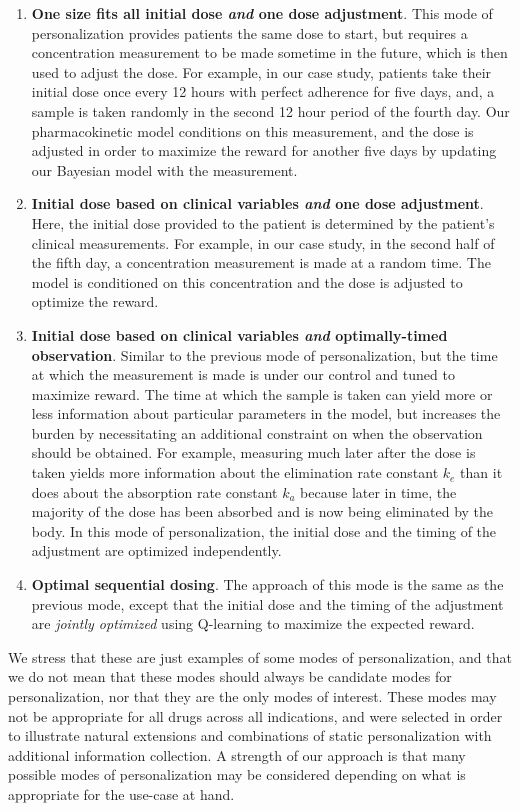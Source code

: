 \begin{enumerate}
	\item \textbf{One size fits all initial dose \textit{and} one dose adjustment}.  This mode of personalization provides patients the same dose to start, but requires a concentration measurement to be made sometime in the future, which is then used to adjust the dose.  For example, in our case study, patients take their initial dose once every 12 hours with perfect adherence for five days, and, a sample is taken randomly in the second 12 hour period of the fourth day.  Our pharmacokinetic model conditions on this measurement, and the dose is adjusted in order to maximize the reward for another five days by updating our Bayesian model with the measurement.
	
	\item \textbf{Initial dose based on clinical variables \textit{and} one dose adjustment}.  Here, the initial dose provided to the patient is determined by the patient's clinical measurements. For example, in our case study, in the second half of the fifth day, a concentration measurement is made at a random time. The model is conditioned on this concentration and the dose is adjusted to optimize the reward.
	
	\item \textbf{Initial dose based on clinical variables \textit{and} optimally-timed observation}.  Similar to the previous mode of personalization, but the time at which the measurement is made is under our control and tuned to maximize reward. The time at which the sample is taken can yield more or less information about particular parameters in the model, but increases the burden by necessitating an additional constraint on when the observation should be obtained. For example, measuring much later after the dose is taken yields more information about the elimination rate constant $k_e$ than it does about the absorption rate constant $k_a$ because later in time, the majority of the dose has been absorbed and is now being eliminated by the body. In this mode of personalization, the initial dose and the timing of the adjustment are optimized independently. 
	
	\item \textbf{Optimal sequential dosing}. The approach of this mode is the same as the previous mode, except that the initial dose and the timing of the adjustment are \textit{jointly optimized} using Q-learning to maximize the expected reward.
\end{enumerate}
We stress that these are just examples of some modes of personalization, and that we do not mean that these modes should always be candidate modes for personalization, nor that they are the only modes of interest.  These modes may not be appropriate for all drugs across all indications, and were selected in order to illustrate natural extensions and combinations of static personalization with additional information collection. A strength of our approach is that many possible modes of personalization may be considered depending on what is appropriate for the use-case at hand.

